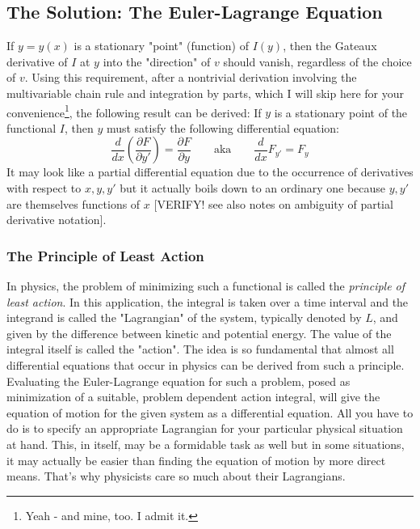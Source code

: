 

\subsection{The Solution: The Euler-Lagrange Equation}
If $y = y(x)$ is a stationary "point" (function) of $I(y)$, then the Gateaux derivative of $I$ at $y$ into the "direction" of $v$ should vanish, regardless of the choice of $v$. Using this requirement, after a nontrivial derivation involving the multivariable chain rule and integration by parts, which I will skip here for your convenience\footnote{Yeah - and mine, too. I admit it.}, the following result can be derived: If $y$ is a stationary point of the functional $I$, then $y$ must satisfy the following differential equation:
\begin{equation}
 \frac{d}{d x} \left(  \frac{\partial F}{\partial y'}  \right) = \frac{\partial F}{\partial y}
 \qquad \text{aka} \qquad
 \frac{d}{d x} F_{y'} = F_{y}
\end{equation}
It may look like a partial differential equation due to the occurrence of derivatives with respect to $x,y,y'$ but it actually boils down to an ordinary one because $y,y'$ are themselves functions of $x$ [VERIFY! see also notes on ambiguity of partial derivative notation].

\subsubsection{The Principle of Least Action}
In physics, the problem of minimizing such a functional is called the \emph{principle of least action}. In this application, the integral is taken over a time interval and the integrand is called the "Lagrangian" of the system, typically denoted by $L$, and given by the difference between kinetic and potential energy. The value of the integral itself is called the "action". The idea is so fundamental that almost all differential equations that occur in physics can be derived from such a principle. Evaluating the Euler-Lagrange equation for such a problem, posed as minimization of a suitable, problem dependent action integral, will give the equation of motion for the given system as a differential equation. All you have to do is to specify an appropriate Lagrangian for your particular physical situation at hand. This, in itself, may be a formidable task as well but in some situations, it may actually be easier than finding the equation of motion by more direct means. That's why physicists care so much about their Lagrangians.

